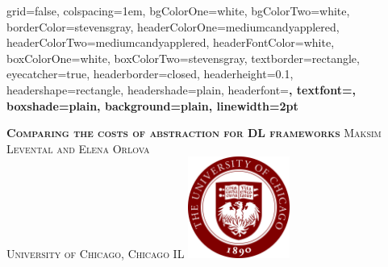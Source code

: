 \documentclass[portrait,final,archD,fontscale=0.477]{baposter}
\begin{document}


\begin{poster}%
  {
    grid=false,
    colspacing=1em,
    bgColorOne=white,
    bgColorTwo=white,
    borderColor=stevensgray,
    headerColorOne=mediumcandyapplered,
    headerColorTwo=mediumcandyapplered,
    headerFontColor=white,
    boxColorOne=white,
    boxColorTwo=stevensgray,
    textborder=rectangle,
    eyecatcher=true,
    headerborder=closed,
    headerheight=0.1\textheight,
    headershape=rectangle,
    headershade=plain,
    headerfont=\Large\bf\textsc, %
    textfont={\setlength{\parindent}{1.5em}},
    boxshade=plain,
    background=plain,
    linewidth=2pt
  }
  {\begin{minipage}{8em}
      \hfill\vspace{1in}
    \end{minipage} } %
  {\bf \textsc{  Comparing the costs of abstraction for DL frameworks } }
  {\textsc{  Maksim Levental and Elena Orlova \\ University of Chicago, Chicago IL}}
  {%
    \includegraphics[height=9.0em]{figures/uchicago_seal.jpg}
  }


\end{poster}
\end{document}
